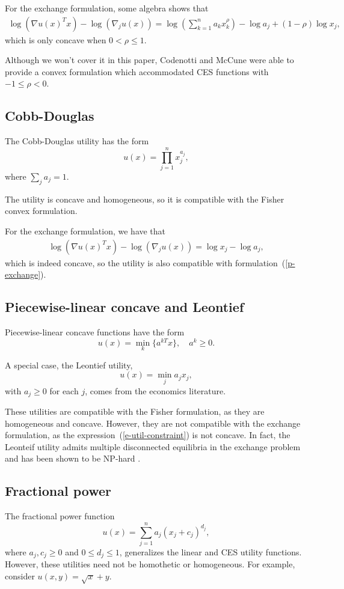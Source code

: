 \documentclass[12pt]{article}
\begin{document}
For the exchange formulation, some algebra shows that 
\begin{align*}
\log(\nabla u(x)^T x) - \log(\nabla_j u(x)) =
\log\left(\sum_{k=1}^n a_k x_k^\rho \right) - \log a_j + (1-\rho) \log x_j,
\end{align*}
which is only concave when $0 < \rho \leq 1$.

Although we won't cover it in this paper, Codenotti and McCune
\cite{codenotti2005marketCES} were able to provide a convex formulation which
accommodated CES functions with $-1 \leq \rho < 0$.

\subsection{Cobb-Douglas}
The Cobb-Douglas utility has the form
\[
u(x) = \prod_{j=1}^{n} x_j^{a_j},
\]
where $\sum_j a_j = 1$.


The utility is concave and homogeneous, so it is compatible with the Fisher
convex formulation.

For the exchange formulation, we have that
\begin{align*}
\log(\nabla u(x)^T x) - \log(\nabla_j u(x)) =
\log x_j - \log a_j,
\end{align*}
which is indeed concave, so the utility is also compatible with
formulation~(\ref{p-exchange}).

\subsection{Piecewise-linear concave and Leontief}
Piecewise-linear concave functions have the form
\[
u(x) = \min_k\lbrace a^{kT}x \rbrace,\quad a^k \geq 0.
\]

A special case, the Leontief utility,
\[
u(x) = \min_j a_j x_j,
\]
with $a_j \geq 0$ for each $j$,  comes from the economics literature. 

These utilities are compatible with the Fisher formulation, as they are
homogeneous and concave. However, they are not compatible with the exchange
formulation, as the expression~(\ref{e-util-constraint}) is not concave. In
fact, the Leonteif utility admits multiple disconnected equilibria in the
exchange problem and has been shown to be NP-hard \cite{codenotti2006leontief}.

\subsection{Fractional power}
The fractional power function
\[
u(x) = \sum_{j=1}^n a_j (x_j+ c_j)^{d_j},
\]
where $a_j, c_j \geq 0$ and $0 \leq d_j \leq 1$,
generalizes the linear and CES utility functions.
However, these utilities need not be homothetic or homogeneous.
For example, consider $u(x,y) = \sqrt{x} + y$.
\end{document}
